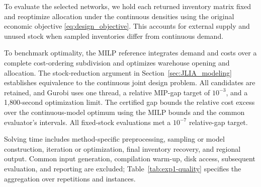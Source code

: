\documentclass[a4paper,fleqn]{cas-sc}
\theoremstyle{remark}
\theoremstyle{plain}
\begin{document}
To evaluate the selected networks, we hold each returned inventory matrix fixed and reoptimize allocation under the continuous densities using the original economic objective \eqref{eq:design_objective}. This accounts for external supply and unused stock when sampled inventories differ from continuous demand.

To benchmark optimality, the MILP reference integrates demand and costs over a complete cost-ordering subdivision and optimizes warehouse opening and allocation. The stock-reduction argument in Section~\ref{sec:JLIA_modeling} establishes equivalence to the continuous joint design problem. All candidates are retained, and Gurobi uses one thread, a relative MIP-gap target of $10^{-3}$, and a 1,800-second optimization limit. The certified gap bounds the relative cost excess over the continuous-model optimum using the MILP bounds and the common evaluator's intervals. All fixed-stock evaluations met a $10^{-7}$ relative-gap target.

Solving time includes method-specific preprocessing, sampling or model construction, iteration or optimization, final inventory recovery, and regional output. Common input generation, compilation warm-up, disk access, subsequent evaluation, and reporting are excluded; Table~\ref{tab:exp1-quality} specifies the aggregation over repetitions and instances.
\end{document}
